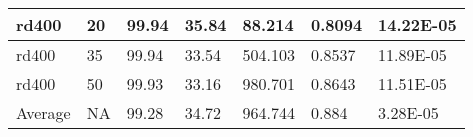 \documentclass{llncs}
\begin{document}
\begin{center}
\begin{longtable}{|l|l|l|l|l|l|l|}
\hline	rd400	&	20	&	99.94	&	35.84	&	88.214	&	0.8094	&	14.22E-05	\\
\hline	rd400	&	35	&	99.94	&	33.54	&	504.103	&	0.8537	&	11.89E-05	\\
\hline	rd400	&	50	&	99.93	&	33.16	&	980.701	&	0.8643	&	11.51E-05	\\
\hline Average     & NA    &   99.28   &  34.72   &    964.744 &  0.884 & 3.28E-05 \\
\hline
\end{longtable}
\end{center}
\end{document}
